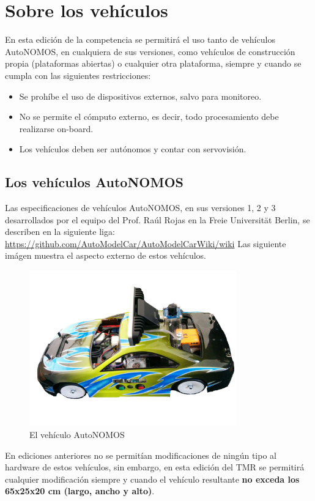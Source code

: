 \documentclass[letterpaper,12pt]{article}
\begin{document}
\section{Sobre los vehículos}
En esta edición de la competencia se permitirá el uso tanto de vehículos AutoNOMOS, en cualquiera de sus versiones, como vehículos de construcción propia (plataformas abiertas) o cualquier otra plataforma, siempre y cuando se cumpla con las siguientes restricciones:
\begin{itemize}
\item Se prohíbe el uso de dispositivos externos, salvo para monitoreo.
\item No se permite el cómputo externo, es decir, todo procesamiento debe realizarse on-board.
\item Los vehículos deben ser autónomos y contar con servovisión.
\end{itemize}

\subsection{Los vehículos AutoNOMOS}
Las especificaciones de vehículos AutoNOMOS, en sus versiones 1, 2 y 3 desarrollados por el equipo del Prof. Raúl Rojas en la Freie Universität Berlin, se describen en la siguiente liga:
\url{https://github.com/AutoModelCar/AutoModelCarWiki/wiki}
Las siguiente imágen muestra el aspecto externo de estos vehículos.
\begin{figure}
  \centering
  \includegraphics[width=0.8\textwidth]{Figures/coverpic.jpg}
  \caption{El vehículo AutoNOMOS}
\end{figure}
En ediciones anteriores no se permitían modificaciones de ningún tipo al hardware de estos vehículos, sin embargo, en esta edición del TMR se permitirá cualquier modificación siempre y cuando el vehículo resultante \textbf{no exceda los 65x25x20 cm (largo, ancho y alto)}.
\end{document}
